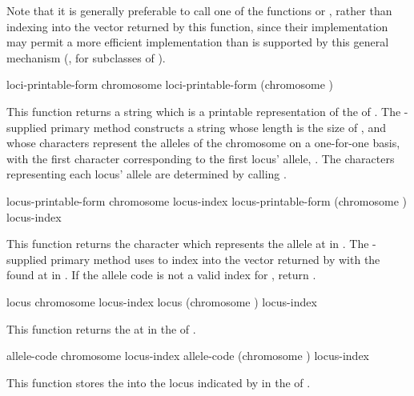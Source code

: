 {\filbreak
Note that it is generally preferable to call one of the functions
 or , rather than
indexing into the vector returned by this function, since their implementation may
permit a more efficient implementation than is supported by this general mechanism
(\eg, for subclasses of ).

\filbreak
{\samepage
\Defgeneric loci-printable-form {chromosome}
 loci-printable-form {(chromosome )}

This function returns a string which is a printable representation of the
 of . The \geco-supplied primary method
constructs a string whose length is the size of , and whose
characters represent the alleles of the chromosome on a one-for-one basis, with the
first character corresponding to the first locus' allele, \etc. The characters
representing each locus' allele are determined by calling
.
\par}%

\filbreak
{\samepage
\Defgeneric locus-printable-form {chromosome locus-index}
 locus-printable-form {(chromosome ) locus-index}

This function returns the character which represents the allele at 
in . The \geco-supplied primary method uses  to index into
the vector returned by  with the  found at  in . If the allele code is not a
valid index for , return .
\par}%

\filbreak
{\samepage
\Defgeneric locus {chromosome locus-index}
 locus {(chromosome ) locus-index}

This function returns the  at  in the
 of .
\par}%

\filbreak
{\samepage
{} {allele-code chromosome locus-index}
 {allele-code (chromosome ) locus-index}

This function stores the  into the locus indicated by  in
the  of .
\par}%

}
